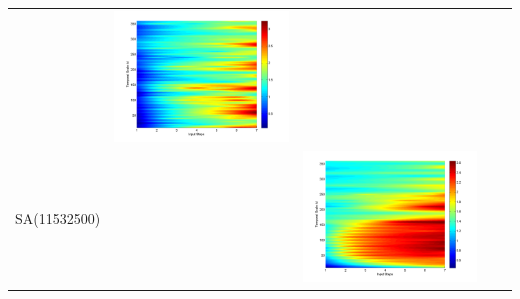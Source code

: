 \documentclass[11pt]{article}
\begin{document}
\begin{table}[H]
{\begin{tabular}{ccccc}
&\begin{minipage}{.3\textwidth}\includegraphics[width=\linewidth]{resultgraph/05585000pepq.png}\end{minipage}
\\
\multirow{8}{*}{SA(11532500)}&
&\begin{minipage}{.3\textwidth}\includegraphics[width=\linewidth]{resultgraph/11532500p.png}\end{minipage}

\end{tabular}}
\end{table}
\end{document}
